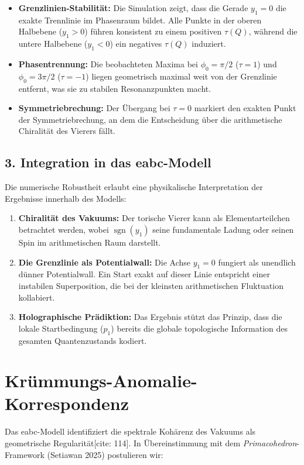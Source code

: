 \documentclass[11pt,a4paper]{article}
\begin{document}
	\begin{itemize}
		\item \textbf{Grenzlinien-Stabilität:} Die Simulation zeigt, dass die Gerade $y_1 = 0$ die exakte Trennlinie im Phasenraum bildet. Alle Punkte in der oberen Halbebene ($y_1 > 0$) führen konsistent zu einem positiven $\tau(Q)$, während die untere Halbebene ($y_1 < 0$) ein negatives $\tau(Q)$ induziert.
		\item \textbf{Phasentrennung:} Die beobachteten Maxima bei $\phi_0 = \pi/2$ ($\tau = 1$) und $\phi_0 = 3\pi/2$ ($\tau = -1$) liegen geometrisch maximal weit von der Grenzlinie entfernt, was sie zu stabilen Resonanzpunkten macht.
		\item \textbf{Symmetriebrechung:} Der Übergang bei $\tau = 0$ markiert den exakten Punkt der Symmetriebrechung, an dem die Entscheidung über die arithmetische Chiralität des Vierers fällt.
	\end{itemize}
	
	\subsection*{3. Integration in das eabc-Modell}
	
	Die numerische Robustheit erlaubt eine physikalische Interpretation der Ergebnisse innerhalb des Modells:
	
	\begin{enumerate}
		\item \textbf{Chiralität des Vakuums:} Der torische Vierer kann als Elementarteilchen betrachtet werden, wobei $\operatorname{sgn}(y_1)$ seine fundamentale Ladung oder seinen Spin im arithmetischen Raum darstellt.
		\item \textbf{Die Grenzlinie als Potentialwall:} Die Achse $y_1 = 0$ fungiert als unendlich dünner Potentialwall. Ein Start exakt auf dieser Linie entspricht einer instabilen Superposition, die bei der kleinsten arithmetischen Fluktuation kollabiert.
		\item \textbf{Holographische Prädiktion:} Das Ergebnis stützt das Prinzip, dass die lokale Startbedingung ($p_1$) bereits die globale topologische Information des gesamten Quantenzustands kodiert.
	\end{enumerate}
	
	\section{Krümmungs-Anomalie-Korrespondenz}
	Das eabc-Modell identifiziert die spektrale Kohärenz des Vakuums als geometrische Regularität[cite: 114]. In Übereinstimmung mit dem \textit{Primacohedron}-Framework (Setiawan 2025) postulieren wir:
	
\end{document}
